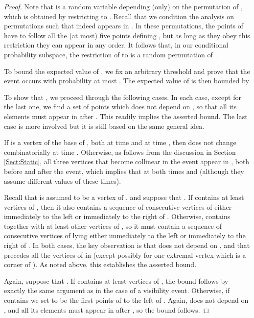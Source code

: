 \documentclass[11pt]{article}
\begin{document}
\begin{proof}
  Note that  is a random variable depending (only) on the permutation
   of , which is obtained by restricting  to
  . Recall that we condition the analysis on permutations 
 such that  indeed appears in .
In these permutations, the points of  have to follow all the (at most) five points defining ,
but as long as they obey this restriction
they can appear in any order.
It follows that, in our conditional probability subspace, the restriction
of  to  is a random permutation of  .

To bound the expected value of , we fix an arbitrary threshold  and prove that the event  occurs with probability at most . The expected value of  is then bounded
by 


To show that , we proceed through the following cases. In each case, except for the last one, we find a set  of  points which does not depend on , so that all its elements must appear in  after . This readily implies the asserted bound. The last case is more involved but it is still based on the same general idea.

\medskip
{} 
If  is a vertex of the base of , both at time  and at time , then  does not change combinatorially at time . Otherwise, as follows from the discussion in Section \ref{Sect:Static}, all three vertices that become collinear in the event appear in , both before and after the event, which implies that  at both times  and  (although they assume different values of these times).


Recall that  is assumed to be a vertex of , and suppose that .  If  contains at least  vertices of
, then it also contains a sequence  of 
consecutive vertices of  either immediately to the
left or immediately to the right of .  Otherwise, 
contains  together with at least  other vertices of
, so it must contain a sequence  of 
consecutive vertices of  lying either immediately to the
left or immediately to the right of .  In both cases, the
key observation is that  does not depend on
, and that 
precedes all the vertices of  in  (except possibly for
one extremal vertex which is a corner of ). As noted above, this establishes the asserted bound.


\medskip
{} 
Again, suppose that .  If  contains
at least  vertices of , the bound follows by exactly the same argument as in the case of a
visibility event. 
Otherwise, if  contains  we set  to be the first  points of  to the left of .
Again,  does not depend on , and all its elements must appear in  after , so the bound follows.






\end{proof}
\end{document}
